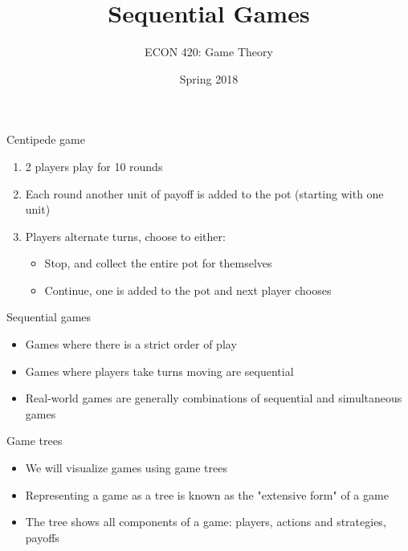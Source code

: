 \documentclass[10pt]{beamer}
\author{ECON 420: Game Theory}
\date{Spring 2018}
\title{Sequential Games}
\begin{document}
\maketitle

\begin{frame}[label={sec:org310cba3}]{}
\alert{Centipede game}
\begin{enumerate}
\item 2 players play for 10 rounds
\item Each round another unit of payoff is added to the pot (starting with one unit)
\item Players alternate turns, choose to either:
\begin{itemize}
\item Stop, and collect the entire pot for themselves
\item Continue, one is added to the pot and next player chooses
\end{itemize}
\end{enumerate}
\end{frame}

\begin{frame}[label={sec:orgf146b48}]{}
\alert{Sequential games}
\begin{itemize}
\item Games where there is a strict order of play
\item Games where players take turns moving are sequential
\item Real-world games are generally combinations of sequential and simultaneous games
\end{itemize}
\end{frame}

\begin{frame}[label={sec:orgf5407a3}]{}
\alert{Game trees}
\begin{itemize}
\item We will visualize games using \alert{game trees}
\item Representing a game as a tree is known as the "extensive form" of a game
\item The tree shows all components of a game: players, actions and strategies, payoffs
\end{itemize}
\end{frame}
\end{document}
